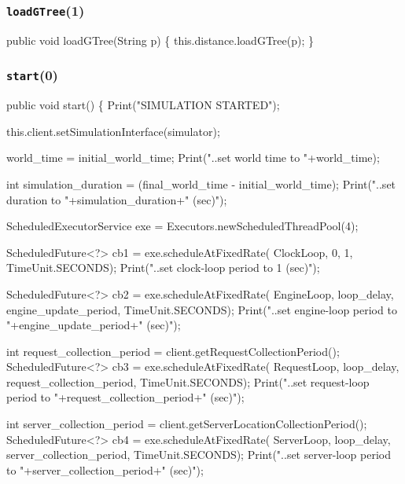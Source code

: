 \documentclass{article}
\def\nwendcode{\endtrivlist \endgroup}      %
\let\nwdocspar=\par
\begin{document}
\subsubsection{{\tt{}\protect{}loadGTree}(1)}
\nwenddocs{}\endmoddef{}
public void loadGTree(String p) \{
  this.distance.loadGTree(p);
\}
\eatline
{}\nwendcode{}\nwdocspar
\subsubsection{{\tt{}\protect{}start}(0)}
\nwenddocs{}\endmoddef{}
public void start() \{
  Print("SIMULATION STARTED");

  this.client.setSimulationInterface(simulator);

  world_time = initial_world_time;
  Print("..set world time to "+world_time);

  int simulation_duration = (final_world_time - initial_world_time);
  Print("..set duration to "+simulation_duration+" (sec)");

  ScheduledExecutorService exe = Executors.newScheduledThreadPool(4);

  ScheduledFuture<?> cb1 = exe.scheduleAtFixedRate(
    ClockLoop, 0, 1, TimeUnit.SECONDS);
  Print("..set clock-loop period to 1 (sec)");

  ScheduledFuture<?> cb2 = exe.scheduleAtFixedRate(
    EngineLoop, loop_delay, engine_update_period, TimeUnit.SECONDS);
  Print("..set engine-loop period to "+engine_update_period+" (sec)");

  int request_collection_period = client.getRequestCollectionPeriod();
  ScheduledFuture<?> cb3 = exe.scheduleAtFixedRate(
    RequestLoop, loop_delay, request_collection_period, TimeUnit.SECONDS);
  Print("..set request-loop period to "+request_collection_period+" (sec)");

  int server_collection_period = client.getServerLocationCollectionPeriod();
  ScheduledFuture<?> cb4 = exe.scheduleAtFixedRate(
    ServerLoop, loop_delay, server_collection_period, TimeUnit.SECONDS);
  Print("..set server-loop period to "+server_collection_period+" (sec)");
\end{document}

